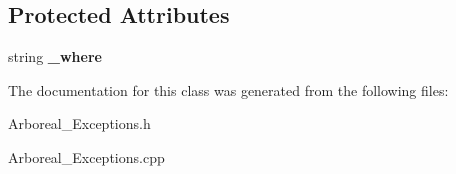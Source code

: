 \subsection*{Protected Attributes}
\begin{DoxyCompactItemize}
\item 
\mbox{\label{classarboreal__exception_a73559e45af28b0804b66b04df4c04270}} 
string {\bfseries \+\_\+where}
\end{DoxyCompactItemize}


The documentation for this class was generated from the following files\+:\begin{DoxyCompactItemize}
\item 
Arboreal\+\_\+\+Exceptions.\+h\item 
Arboreal\+\_\+\+Exceptions.\+cpp\end{DoxyCompactItemize}
